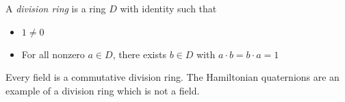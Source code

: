 \documentclass{article}
\begin{document}
A \emph{division ring} is a ring $D$ with identity such that
\begin{itemize}
\item $1 \neq 0$
\item For all nonzero $a \in D$, there exists $b \in D$ with $a \cdot b = b \cdot a = 1$
\end{itemize}
Every field is a commutative division ring. The Hamiltonian quaternions are an example of a division ring which is not a field.
\end{document}
